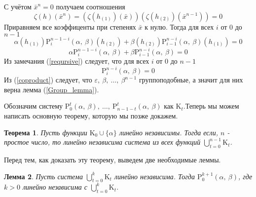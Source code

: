 \documentclass[12pt, reqno, a4paper, oneside, notitlepage]{amsart}
\theoremstyle{mytheoremstyle}
\newtheorem{theorem}{Теорема}[section]
\newtheorem{lemma}[theorem]{Лемма}
\theoremstyle{myremarkstyle}
\numberwithin{equation}{section}
\begin{document}
С учётом $\bar x^n = 0$ получаем соотношения
\[
  \zeta(h)(\bar x^n) =  \left(\zeta(h_{(1)})(\bar x)\right) \left(\zeta(h_{(2)})(\bar x^{n-1})\right) = 0
\]
Приравняем все коэффиценты при степенях $\bar x$ к нулю. Тогда для всех $i$ от $0$ до $n-1$ 
\[
  \alpha(h_{(1)})\mathrm{P}^{n-1-i}_i(\alpha,\ \beta)(h_{(2)})+\beta(h_{(2)})\mathrm{P}^{n-i}_{i-1}(\alpha,\ \beta)(h_{(1)}) = 0
\]
\[
  \alpha\mathrm{P}^{n-1-i}_i(\alpha,\ \beta)+\beta\mathrm{P}^{n-i}_{i-1}(\alpha,\ \beta) = 0
\]
Из замечания (\ref{reqursive}) следует, что для всех $i$ от $0$ до $n-1$ 
\begin{equation} \label{null}
  \mathrm{P}^{n-i}_{i}(\alpha,\ \beta) = 0
\end{equation}
Из (\ref{coproduct}) следует, что $\varepsilon,\ \beta,\ \dots,\ \beta^{n-1}$ группоподобные, а значит для них верна лемма (\ref{Group_lemma}).

Обозначим систему $\mathrm{P}^t_0(\alpha,\ \beta),\ \dots,\ \mathrm{P}^t_{n-1-t}(\alpha,\ \beta)$ как $\mathrm{K}_t$.Теперь мы можем написать основную теорему, которую мы позже докажем.

\begin{theorem}\label{main}
  Пусть функции $\mathrm{K}_0 \cup \{\alpha\}$ линейно независимы. Тогда если, $n$ - простое число, то линейно независима система из всех функций $\bigcup\limits_{t = 0}^{n-1}\mathrm{K}_t$.
\end{theorem}

Перед тем, как доказать эту теорему, выведем две необходимые леммы.
\begin{lemma} \label{support1}
  Пусть система $\bigcup\limits_{t = 0}^k\mathrm{K}_t$ линейно независима. Тогда $\mathrm{P}^{k+1}_0(\alpha,\ \beta)$, где $k >0$ линейно независима с $\bigcup\limits_{t = 0}^k\mathrm{K}_t$.
\end{lemma}
\end{document}
